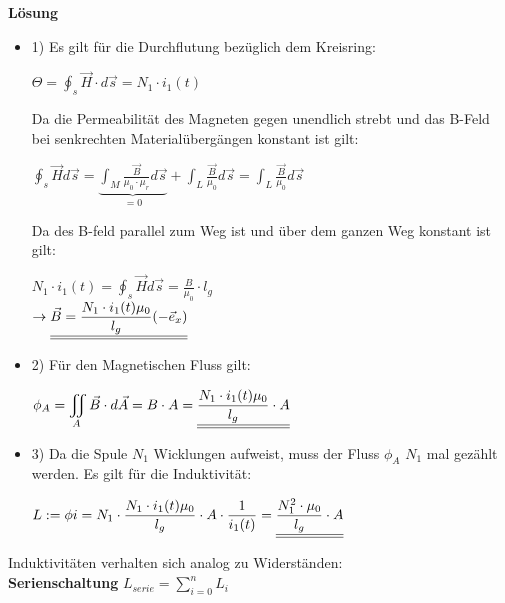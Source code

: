 \iend
\newpage

\beginip
\textbf{Lösung}
\begin{itemize}
\item 1) Es gilt für die Durchflutung bezüglich dem Kreisring:
			\begin{center}
				$\Theta =  \oint_s \vec{H}\cdot d\vec{s} = N_1\cdot i_1(t)$
			\end{center}
			Da die Permeabilität des Magneten gegen unendlich strebt und das B-Feld bei senkrechten Materialübergängen konstant ist gilt: \\

			\begin{center}
			$\displaystyle \oint_s \vec{H} d\vec{s} = \underbrace{\int_{M} \frac{\vec{B}}{\mu_0 \cdot \mu_r} d\vec{s}}_{=0} + \int_{L} \frac{\vec{B}}{\mu_0} d\vec{s} = \int_{L} \frac{\vec{B}}{\mu_0} d\vec{s} $
		\end{center}
		Da des B-feld parallel zum Weg ist und über dem ganzen Weg konstant ist gilt:
		\begin{center}
				$\displaystyle N_1 \cdot i_1(t) = \displaystyle \oint_s \vec{H} d\vec{s} = \frac{B}{\mu_0} \cdot l_g$ \\
				$\displaystyle \rightarrow \underline{\underline{\vec{B} = \frac{N_1 \cdot i_1(t) \mu_0}{l_g} (-\vec{e}_x)}}$
		\end{center}

		\item 2) Für den Magnetischen Fluss gilt:
		\begin{center}
				$\displaystyle \phi_A = \iint_A \vec{B} \cdot d\vec{A} = B \cdot A =\underline{\underline{\frac{N_1 \cdot i_1(t) \mu_0}{l_g} \cdot A}}$
		\end{center}

		\item 3) Da die Spule $N_1$ Wicklungen aufweist, muss der Fluss $\phi_A$ $N_1$ mal gezählt werden. Es gilt für die Induktivität:
		\begin{center}
				$ \displaystyle L:= {\phi}{i} = N_1 \cdot  \frac{N_1 \cdot i_1(t) \mu_0}{l_g} \cdot A \cdot \frac{1}{i_1(t)} =  \underline{\underline{\frac{N_1^2 \cdot \mu_0}{l_g} \cdot A}}$
		\end{center}
\end{itemize}

\iend




	 \beginip
	 	Induktivitäten verhalten sich analog zu Widerständen: \\
		\textbf{Serienschaltung}
		\formulaBegin
		$ L_{serie} = \sum_{i=0}^n L_i $
		\formulaEnd

